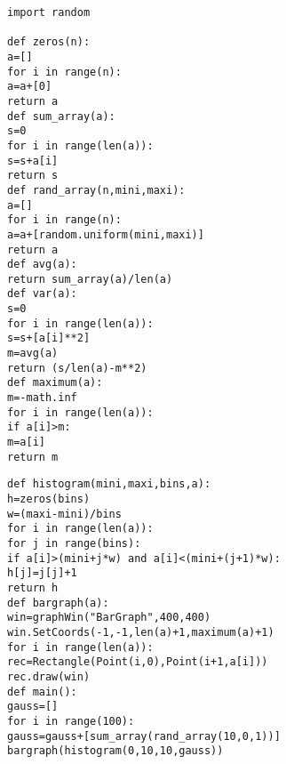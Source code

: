 \begin{shaded}
\begin{verbatim}
import random

def zeros(n):
a=[]
for i in range(n):
a=a+[0]
return a
def sum_array(a):
s=0
for i in range(len(a)):
s=s+a[i]
return s
def rand_array(n,mini,maxi):
a=[]
for i in range(n):
a=a+[random.uniform(mini,maxi)]
return a
def avg(a):
return sum_array(a)/len(a)
def var(a):
s=0
for i in range(len(a)):
s=s+[a[i]**2]
m=avg(a)
return (s/len(a)-m**2)
def maximum(a):
m=-math.inf
for i in range(len(a)):
if a[i]>m:
m=a[i]
return m
\end{verbatim}
\end{shaded}


\begin{shaded}
\begin{verbatim}
def histogram(mini,maxi,bins,a):
h=zeros(bins)
w=(maxi-mini)/bins
for i in range(len(a)):
for j in range(bins):
if a[i]>(mini+j*w) and a[i]<(mini+(j+1)*w):
h[j]=j[j]+1
return h
def bargraph(a):
win=graphWin("BarGraph",400,400)
win.SetCoords(-1,-1,len(a)+1,maximum(a)+1)
for i in range(len(a)):
rec=Rectangle(Point(i,0),Point(i+1,a[i]))
rec.draw(win)
def main():
gauss=[]
for i in range(100):
gauss=gauss+[sum_array(rand_array(10,0,1))]
bargraph(histogram(0,10,10,gauss))

\end{verbatim}
\end{shaded}
